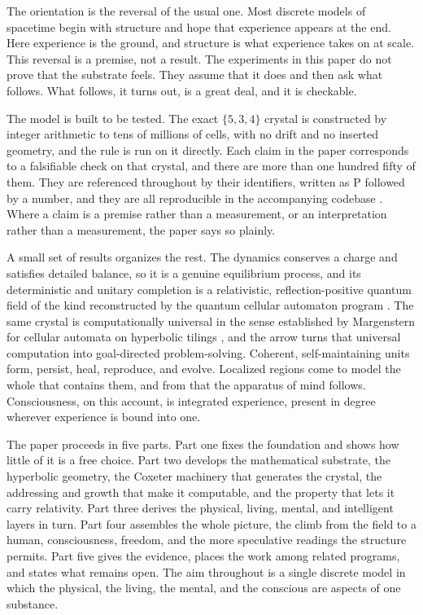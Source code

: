 The orientation is the reversal of the usual one. Most discrete models of spacetime begin with structure
and hope that experience appears at the end. Here experience is the ground, and structure is what experience
takes on at scale. This reversal is a premise, not a result. The experiments in this paper do not prove
that the substrate feels. They assume that it does and then ask what follows. What follows, it turns out,
is a great deal, and it is checkable.

The model is built to be tested. The exact $\{5,3,4\}$ crystal is constructed by integer arithmetic to tens
of millions of cells, with no drift and no inserted geometry, and the rule is run on it directly. Each
claim in the paper corresponds to a falsifiable check on that crystal, and there are more than one hundred
fifty of them. They are referenced throughout by their identifiers, written as P followed by a number, and
they are all reproducible in the accompanying codebase \cite{pollard2026vibetest}. Where a claim is a
premise rather than a measurement, or an interpretation rather than a measurement, the paper says so
plainly.

A small set of results organizes the rest. The dynamics conserves a charge and satisfies detailed balance,
so it is a genuine equilibrium process, and its deterministic and unitary completion is a relativistic,
reflection-positive quantum field of the kind reconstructed by the quantum cellular automaton program
\cite{bisio2015, arrighi2014}. The same crystal is computationally universal in the sense established by
Margenstern for cellular automata on hyperbolic tilings \cite{margenstern2013}, and the arrow turns that
universal computation into goal-directed problem-solving. Coherent, self-maintaining units form, persist,
heal, reproduce, and evolve. Localized regions come to model the whole that contains them, and from that
the apparatus of mind follows. Consciousness, on this account, is integrated experience, present in degree
wherever experience is bound into one.

The paper proceeds in five parts. Part one fixes the foundation and shows how little of it is a free choice.
Part two develops the mathematical substrate, the hyperbolic geometry, the Coxeter machinery that generates
the crystal, the addressing and growth that make it computable, and the property that lets it carry
relativity. Part three derives the physical, living, mental, and intelligent layers in turn. Part four
assembles the whole picture, the climb from the field to a human, consciousness, freedom, and the more
speculative readings the structure permits. Part five gives the evidence, places the work among related
programs, and states what remains open. The aim throughout is a single discrete model in which the physical,
the living, the mental, and the conscious are aspects of one substance.
